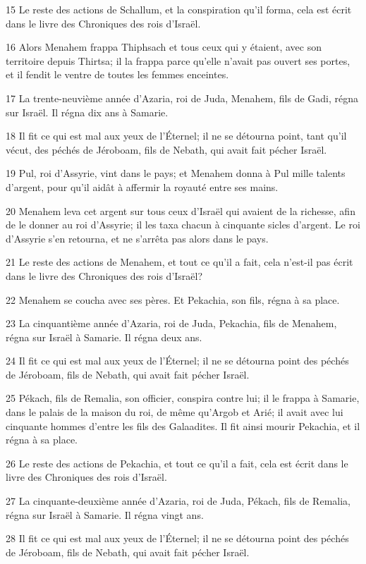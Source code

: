 \par 15 Le reste des actions de Schallum, et la conspiration qu'il forma, cela est écrit dans le livre des Chroniques des rois d'Israël.
\par 16 Alors Menahem frappa Thiphsach et tous ceux qui y étaient, avec son territoire depuis Thirtsa; il la frappa parce qu'elle n'avait pas ouvert ses portes, et il fendit le ventre de toutes les femmes enceintes.
\par 17 La trente-neuvième année d'Azaria, roi de Juda, Menahem, fils de Gadi, régna sur Israël. Il régna dix ans à Samarie.
\par 18 Il fit ce qui est mal aux yeux de l'Éternel; il ne se détourna point, tant qu'il vécut, des péchés de Jéroboam, fils de Nebath, qui avait fait pécher Israël.
\par 19 Pul, roi d'Assyrie, vint dans le pays; et Menahem donna à Pul mille talents d'argent, pour qu'il aidât à affermir la royauté entre ses mains.
\par 20 Menahem leva cet argent sur tous ceux d'Israël qui avaient de la richesse, afin de le donner au roi d'Assyrie; il les taxa chacun à cinquante sicles d'argent. Le roi d'Assyrie s'en retourna, et ne s'arrêta pas alors dans le pays.
\par 21 Le reste des actions de Menahem, et tout ce qu'il a fait, cela n'est-il pas écrit dans le livre des Chroniques des rois d'Israël?
\par 22 Menahem se coucha avec ses pères. Et Pekachia, son fils, régna à sa place.
\par 23 La cinquantième année d'Azaria, roi de Juda, Pekachia, fils de Menahem, régna sur Israël à Samarie. Il régna deux ans.
\par 24 Il fit ce qui est mal aux yeux de l'Éternel; il ne se détourna point des péchés de Jéroboam, fils de Nebath, qui avait fait pécher Israël.
\par 25 Pékach, fils de Remalia, son officier, conspira contre lui; il le frappa à Samarie, dans le palais de la maison du roi, de même qu'Argob et Arié; il avait avec lui cinquante hommes d'entre les fils des Galaadites. Il fit ainsi mourir Pekachia, et il régna à sa place.
\par 26 Le reste des actions de Pekachia, et tout ce qu'il a fait, cela est écrit dans le livre des Chroniques des rois d'Israël.
\par 27 La cinquante-deuxième année d'Azaria, roi de Juda, Pékach, fils de Remalia, régna sur Israël à Samarie. Il régna vingt ans.
\par 28 Il fit ce qui est mal aux yeux de l'Éternel; il ne se détourna point des péchés de Jéroboam, fils de Nebath, qui avait fait pécher Israël.
